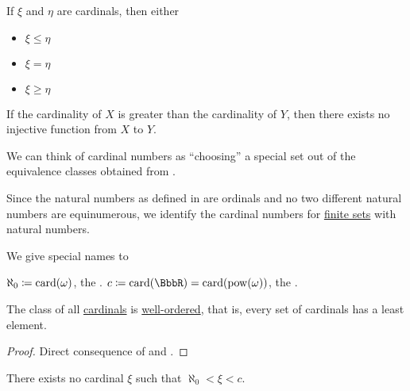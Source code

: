 \begin{theorem}\label{thm:cardinal_trichotomy}
  If \( \xi \) and \( \eta \) are cardinals, then either
  \begin{itemize}
    \item \( \xi \leq \eta \)
    \item \( \xi = \eta \)
    \item \( \xi \geq \eta \)
  \end{itemize}
\end{theorem}

\begin{corollary}\label{def:pigeonhole_principle}
  If the cardinality of \( X \) is greater than the cardinality of \( Y \), then there exists no injective function from \( X \) to \( Y \).
\end{corollary}

\begin{remark}\label{rem:cardinals}
  We can think of cardinal numbers as \enquote{choosing} a special set out of the equivalence classes obtained from .

  Since the natural numbers as defined in  are ordinals and no two different natural numbers are equinumerous, we identify the cardinal numbers for \hyperref[def:finite_set]{finite sets} with natural numbers.

  We give special names to
  \begin{thmenum}
     \( \aleph_0 \coloneqq \operatorname{card}(\omega) \), the .
     \( c \coloneqq \card(\BbbR) = \card(\pow(\omega)) \), the .
  \end{thmenum}
\end{remark}

\begin{proposition}\label{thm:cardinals_well_ordered}
  The class of all \hyperref[def:cardinal]{cardinals} is \hyperref[def:well_ordered_set]{well-ordered}, that is, every set of cardinals has a least element.
\end{proposition}
\begin{proof}
  Direct consequence of  and .
\end{proof}

\begin{conjecture}\label{hyp:continuum_hypothesis}
  There exists no cardinal \( \xi \) such that \( \aleph_0 < \xi < c \).
\end{conjecture}

